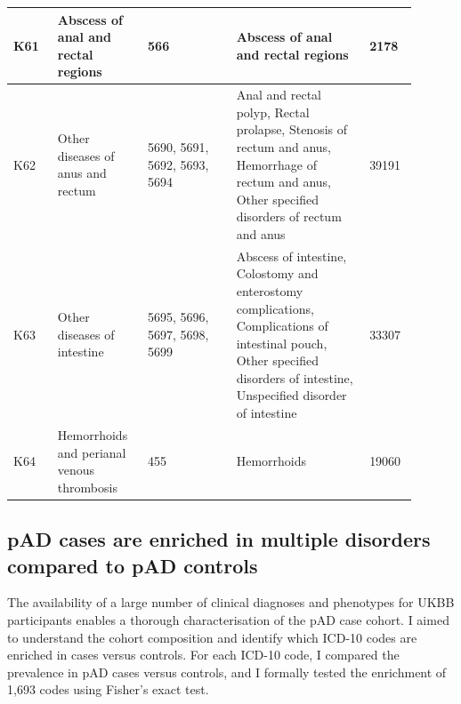 \begin{table}[H]
\begin{tabular}{|p{0.1\linewidth}|p{0.2\linewidth}|p{0.2\linewidth}|p{0.3\linewidth}|p{0.1\linewidth}|}
  K61         & Abscess of anal and rectal regions                        & 566                                 & Abscess of anal and rectal regions              &     2178                                                                                                                        \\ \hline
  K62         & Other diseases of anus and rectum                         & 5690, 5691, 5692, 5693, 5694            & Anal and rectal polyp, Rectal prolapse, Stenosis of rectum and anus, Hemorrhage of rectum and anus, Other specified disorders of rectum and anus            & 39191                \\ \hline
  K63         & Other diseases of intestine                               & 5695, 5696, 5697, 5698, 5699            & Abscess of intestine, Colostomy and enterostomy complications, Complications of intestinal pouch, Other specified disorders of intestine, Unspecified disorder of intestine & 33307 \\ \hline
  K64         & Hemorrhoids and perianal venous thrombosis                & 455                                 & Hemorrhoids & 19060\\ \hline

  \end{tabular}
  \end{table}
  \subsection{pAD cases are enriched in multiple disorders compared to pAD controls}\label{section:pheno_enrich}
  The availability of a large number of clinical diagnoses and phenotypes for UKBB participants enables a thorough characterisation of the pAD case cohort. I aimed to understand the cohort composition and identify which ICD-10 codes are enriched in cases versus controls. For each ICD-10 code, I compared the prevalence in pAD cases versus controls, and I formally tested the enrichment of 1,693 codes using Fisher's exact test. \\

